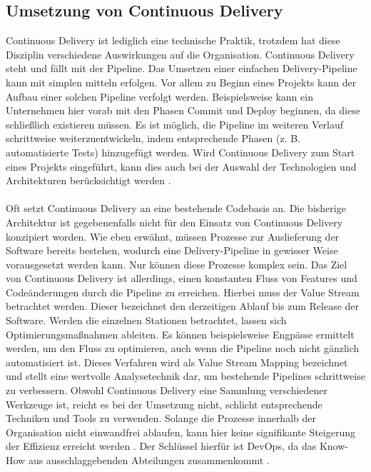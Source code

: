 \subsection{Umsetzung von Continuous Delivery}
Continuous Delivery ist lediglich eine technische Praktik, trotzdem hat diese Disziplin verschiedene Auswirkungen auf die Organisation. Continuous Delivery steht und fällt mit der Pipeline. Das Umsetzen einer einfachen Delivery-Pipeline kann mit simplen mitteln erfolgen. Vor allem zu Beginn eines Projekts kann der Aufbau einer solchen Pipeline verfolgt werden. Beispielsweise kann ein Unternehmen hier vorab mit den Phasen Commit und Deploy beginnen, da diese schließlich existieren müssen. Es ist möglich, die Pipeline im weiteren Verlauf schrittweise weiterzuentwickeln, indem entsprechende Phasen (z. B. automatisierte Tests) hinzugefügt werden. Wird Continuous Delivery zum Start eines Projekts eingeführt, kann dies auch bei der Auswahl der Technologien und Architekturen berücksichtigt werden \cite{Wolff.2016}. \\ \\
Oft setzt Continuous Delivery an eine bestehende Codebasis an. Die bisherige Architektur ist gegebenenfalls nicht für den Einsatz von Continuous Delivery konzipiert worden. Wie eben erwähnt, müssen Prozesse zur Auslieferung der Software bereits bestehen, wodurch eine Delivery-Pipeline in gewisser Weise vorausgesetzt werden kann. Nur können diese Prozesse komplex sein. Das Ziel von Continuous Delivery ist allerdings, einen konstanten Fluss von Features und Codeänderungen durch die Pipeline zu erreichen. Hierbei muss der Value Stream betrachtet werden. Dieser bezeichnet den derzeitigen Ablauf bis zum Release der Software. Werden die einzelnen Stationen betrachtet, lassen sich Optimierungsmaßnahmen ableiten. Es können beispielsweise Engpässe ermittelt werden, um den Fluss zu optimieren, auch wenn die Pipeline noch nicht gänzlich automatisiert ist. Dieses Verfahren wird als Value Stream Mapping bezeichnet und stellt eine wertvolle Analysetechnik dar, um bestehende Pipelines schrittweise zu verbessern. Obwohl Continuous Delivery eine Sammlung verschiedener Werkzeuge ist, reicht es bei der Umsetzung nicht, schlicht entsprechende Techniken und Tools zu verwenden. Solange die Prozesse innerhalb der Organisation nicht einwandfrei ablaufen, kann hier keine signifikante Steigerung der Effizienz erreicht werden \cite{Virmani.2015}. Der Schlüssel hierfür ist DevOps, da das Know-How aus ausschlaggebenden Abteilungen zusammenkommt \cite{Wolff.2016}.

